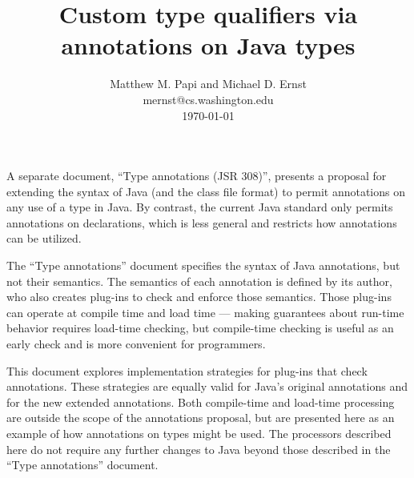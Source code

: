 \documentclass[10pt]{article}
\begin{document}
\newcommand{\code}[1]{\ifmmode{\mbox{\smaller\ttfamily{#1}}}\else{\smaller\ttfamily #1}\fi}

\makeatletter
\def\topfigrule{\kern3\p@ \hrule \kern -3.4\p@} %
\def\botfigrule{\kern-3\p@ \hrule \kern 2.6\p@} %
\def\dblfigrule{\kern3\p@ \hrule \kern -3.4\p@} %
\makeatother



\title{Custom type qualifiers via annotations on Java types}
\author{Matthew M. Papi and Michael D. Ernst \\
{\ttfamily mernst@cs.washington.edu} \\
\today
}
\maketitle


A separate document, ``Type annotations (JSR 308)'', presents a proposal for
extending the syntax of Java (and the class file format) to permit
annotations on any use of a type in Java.  By contrast, the current Java
standard only permits annotations on declarations, which is less general
and restricts how annotations can be utilized.

The ``Type annotations'' document specifies the syntax of Java
annotations, but not their semantics.  The semantics of each annotation is
defined by its author, who also creates plug-ins to check and enforce those
semantics.  Those plug-ins can operate at compile time and load time ---
making guarantees about run-time behavior requires load-time checking, but
compile-time checking is useful as an early check and is more convenient
for programmers.

This document explores implementation strategies for plug-ins that check
annotations.  These strategies are equally valid for Java's original
annotations and for the new extended annotations.  Both compile-time and
load-time processing are outside the scope of the annotations proposal, but
are presented here as an example of how annotations on types might be used.
The processors described here do not require any further changes to Java
beyond those described in the ``Type annotations'' document.
\end{document}

